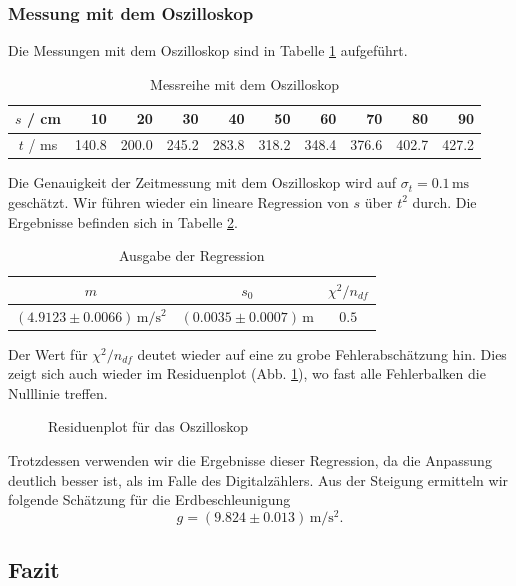 \documentclass[a4paper, 12pt]{scrartcl}
\begin{document}
\subsubsection{Messung mit dem Oszilloskop}

Die Messungen mit dem Oszilloskop sind in Tabelle \ref{tableOs} aufgeführt. 
\begin{table}[h!]
\begin{center}
\begin{tabular}{c|r|r|r|r|r|r|r|r|r}
$s$ / cm & 10 & 20 & 30 & 40 & 50 & 60 & 70 & 80 & 90 \\
\hline
$t$ / ms & 140.8 & 200.0 & 245.2 & 283.8 & 318.2 & 348.4 & 376.6 & 402.7 & 427.2 \\
\end{tabular}
\caption{Messreihe mit dem Oszilloskop}
\label{tableOs}
\end{center}
\end{table}

Die Genauigkeit der Zeitmessung mit dem Oszilloskop wird auf $\sigma_t = 0.1 \, \mathrm{ms}$ geschätzt. Wir führen wieder ein lineare Regression von $s$ über $t^2$ durch. Die Ergebnisse befinden sich in Tabelle \ref{tableReg2}.

\begin{table}[h!]
\begin{center}
\begin{tabular}{c|c|c}
$m$ & $s_0$ & $\chi^2/n_{df}$ \\
\hline
$(4.9123 \pm 0.0066) \, \mathrm m / \mathrm s^2$ & $(0.0035 \pm 0.0007) \, \mathrm m$ & $0.5$
\end{tabular}
\caption{Ausgabe der Regression}
\label{tableReg2}
\end{center}
\end{table}

Der Wert für $\chi^2/n_{df}$ deutet wieder auf eine zu grobe Fehlerabschätzung hin. Dies zeigt sich auch wieder im Residuenplot (Abb. \ref{ResOz}), wo fast alle Fehlerbalken die Nulllinie treffen.
\begin{figure}[h!]
	\centering
	\caption{Residuenplot für das Oszilloskop}
	\label{ResOz}
\end{figure}
Trotzdessen verwenden wir die Ergebnisse dieser Regression, da die Anpassung deutlich besser ist, als im Falle des Digitalzählers. Aus der Steigung ermitteln wir folgende Schätzung für die Erdbeschleunigung
$$g = (9.824 \pm 0.013) \, \mathrm m / \mathrm s^2 .$$


\subsection{Fazit}
\end{document}
